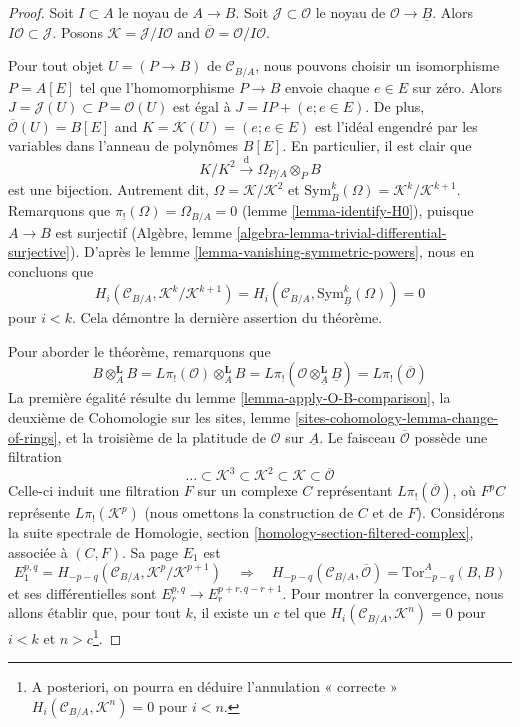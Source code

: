 \begin{proof}
Soit $I \subset A$ le noyau de $A \to B$. Soit
$\mathcal{J} \subset \mathcal{O}$ le noyau de
$\mathcal{O} \to \underline{B}$. Alors
$I\mathcal{O} \subset \mathcal{J}$. Posons
$\mathcal{K} = \mathcal{J}/I\mathcal{O}$ and
$\overline{\mathcal{O}} = \mathcal{O}/I\mathcal{O}$.

\medskip\noindent
Pour tout objet $U = (P \to B)$ de $\mathcal{C}_{B/A}$, nous pouvons choisir
un isomorphisme $P = A[E]$ tel que l'homomorphisme $P \to B$ envoie chaque
$e \in E$ sur zéro. Alors
$J = \mathcal{J}(U) \subset P = \mathcal{O}(U)$
est égal à $J = IP + (e; e \in E)$. De plus,
$\overline{\mathcal{O}}(U) = B[E]$ and $K = \mathcal{K}(U) = (e; e \in E)$
est l'idéal engendré par les variables dans l'anneau de polynômes $B[E]$. En
particulier, il est clair que
$$
K/K^2 \xrightarrow{\text{d}} \Omega_{P/A} \otimes_P B
$$
est une bijection. Autrement dit, $\Omega = \mathcal{K}/\mathcal{K}^2$ et
$\text{Sym}_B^k(\Omega) = \mathcal{K}^k/\mathcal{K}^{k + 1}$. Remarquons que
$\pi_!(\Omega) = \Omega_{B/A} = 0$ (lemme \ref{lemma-identify-H0}), puisque
$A \to B$ est surjectif (Algèbre, lemme
\ref{algebra-lemma-trivial-differential-surjective}). D'après le lemme
\ref{lemma-vanishing-symmetric-powers}, nous en concluons que
$$
H_i(\mathcal{C}_{B/A}, \mathcal{K}^k/\mathcal{K}^{k + 1}) =
H_i(\mathcal{C}_{B/A}, \text{Sym}^k_{\underline{B}}(\Omega)) = 0
$$
pour $i < k$. Cela démontre la dernière assertion du théorème.

\medskip\noindent
Pour aborder le théorème, remarquons que
$$
B \otimes_A^\mathbf{L} B = L\pi_!(\mathcal{O}) \otimes_A^\mathbf{L} B =
L\pi_!(\mathcal{O} \otimes_{\underline{A}}^\mathbf{L} \underline{B}) =
L\pi_!(\overline{\mathcal{O}})
$$
La première égalité résulte du lemme \ref{lemma-apply-O-B-comparison}, la
deuxième de Cohomologie sur les sites, lemme
\ref{sites-cohomology-lemma-change-of-rings}, et la troisième de la platitude
de $\mathcal{O}$ sur $\underline{A}$. Le faisceau
$\overline{\mathcal{O}}$ possède une filtration
$$
\ldots \subset
\mathcal{K}^3 \subset
\mathcal{K}^2 \subset
\mathcal{K} \subset
\overline{\mathcal{O}}
$$
Celle-ci induit une filtration $F$ sur un complexe $C$ représentant
$L\pi_!(\overline{\mathcal{O}})$, où $F^pC$ représente
$L\pi_!(\mathcal{K}^p)$ (nous omettons la construction de $C$ et de $F$).
Considérons la suite spectrale de Homologie, section
\ref{homology-section-filtered-complex}, associée à $(C, F)$. Sa page $E_1$
est
$$
E_1^{p, q} = H_{- p - q}(\mathcal{C}_{B/A}, \mathcal{K}^p/\mathcal{K}^{p + 1})
\quad\Rightarrow\quad
H_{- p - q}(\mathcal{C}_{B/A}, \overline{\mathcal{O}}) = 
\text{Tor}_{- p - q}^A(B, B)
$$
et ses différentielles sont
$E_r^{p, q} \to E_r^{p + r, q - r + 1}$. Pour montrer la convergence, nous
allons établir que, pour tout $k$, il existe un $c$ tel que
$H_i(\mathcal{C}_{B/A}, \mathcal{K}^n) = 0$
pour $i < k$ et $n > c$\footnote{A posteriori, on pourra en déduire
l'annulation « correcte » $H_i(\mathcal{C}_{B/A}, \mathcal{K}^n) = 0$ pour
$i < n$.}.


\end{proof}
